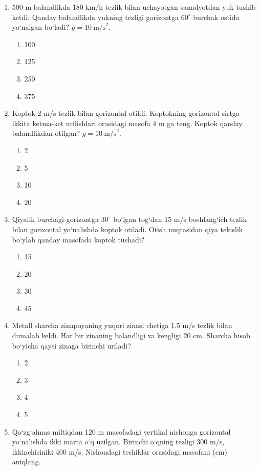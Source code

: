 \begin{enumerate}
\item 500 m balandlikda 180 km/h tezlik bilan uchayotgan samolyotdan yuk tushib ketdi. Qanday balandlikda yukning tezligi gorizontga $60^\circ$ burchak ostida yo‘nalgan bo‘ladi? $g=10\ \text{m/s}^2$.

\begin{enumerate}[label=\Alph*)]
\item 100
\item 125
\item 250
\item 375
\end{enumerate}

\item Koptok 2 m/s tezlik bilan gorizontal otildi. Koptokning gorizontal sirtga ikkita ketma-ket urilishlari orasidagi masofa 4 m ga teng. Koptok qanday balandlikdan otilgan? $g=10\ \text{m/s}^2$.

\begin{enumerate}[label=\Alph*)]
\item 2
\item 5
\item 10
\item 20
\end{enumerate}

\item Qiyalik burchagi gorizontga $30^\circ$ bo‘lgan tog‘dan 15 m/s boshlang‘ich tezlik bilan gorizontal yo‘nalishda koptok otiladi. Otish nuqtasidan qiya tekislik bo‘ylab qanday masofada koptok tushadi?

\begin{enumerate}[label=\Alph*)]
\item 15
\item 20
\item 30
\item 45
\end{enumerate}

\item Metall sharcha zinapoyaning yuqori zinasi chetiga 1.5 m/s tezlik bilan dumalab keldi. Har bir zinaning balandligi va kengligi 20 cm. Sharcha hisob bo‘yicha qaysi zinaga birinchi uriladi?

\begin{enumerate}[label=\Alph*)]
\item 2
\item 3
\item 4
\item 5
\end{enumerate}

\item Qo‘zg‘almas miltiqdan 120 m masofadagi vertikal nishonga gorizontal yo‘nalishda ikki marta o‘q uzilgan. Birinchi o‘qning tezligi 300 m/s, ikkinchisiniki 400 m/s. Nishondagi teshiklar orasidagi masofani (cm) aniqlang.


\end{enumerate}
